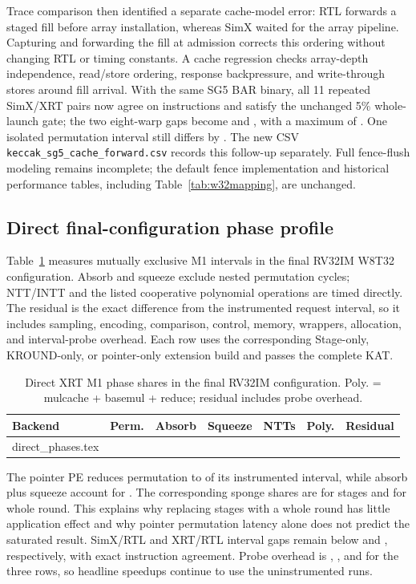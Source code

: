 \documentclass[conference,letterpaper]{IEEEtran}
\makeatletter
\newcommand{\tablerows}[1]{\@@input #1 }
\newcommand{\src}[1]{\par\smallskip{\scriptsize Source: \nolinkurl{#1}.}}
\makeatother
\begin{document}
Trace comparison then identified a separate cache-model error: RTL forwards
a staged fill before array installation, whereas SimX waited for the array
pipeline. Capturing and forwarding the fill at admission corrects this
ordering without changing RTL or timing constants. A cache regression checks
array-depth independence, read/store ordering, response backpressure, and
write-through stores around fill arrival. With the same SG5 BAR binary,
all 11 repeated SimX/XRT pairs now agree on instructions and satisfy the
unchanged 5\% whole-launch gate; the two eight-warp gaps become
\SgFiveCacheGapPacked{} and \SgFiveCacheGapSingle{}, with a maximum of
\SgFiveCacheMaxGap{}. One isolated permutation interval still differs by
\SgFiveCacheMaxSpanGap{}. The new CSV \texttt{keccak\_sg5\_cache\_forward.csv}
records this follow-up separately. Full fence-flush modeling remains
incomplete; the default fence implementation and historical performance
tables, including Table~\ref{tab:w32mapping}, are unchanged.

\subsection{Direct final-configuration phase profile}
Table~\ref{tab:directphases} measures mutually exclusive M1 intervals in the
final RV32IM W8T32 configuration. Absorb and squeeze exclude nested
permutation cycles; NTT/INTT and the listed cooperative polynomial operations
are timed directly. The residual is the exact difference from the
instrumented request interval, so it includes sampling, encoding, comparison,
control, memory, wrappers, allocation, and interval-probe overhead. Each row
uses the corresponding Stage-only, KROUND-only, or pointer-only extension
build and passes the complete KAT.

\begin{table}[t]
\caption{Direct XRT M1 phase shares in the final RV32IM configuration.
Poly. = mulcache + basemul + reduce; residual includes probe overhead.}
\label{tab:directphases}
\centering\scriptsize\setlength{\tabcolsep}{2pt}
\begin{tabular}{@{}lrrrrrr@{}}
\toprule
Backend & Perm. & Absorb & Squeeze & NTTs & Poly. & Residual \\
\midrule
\tablerows{direct_phases.tex}
\bottomrule
\end{tabular}
\src{pqc/results/mlkem_phase_profile.csv}
\end{table}

The pointer PE reduces permutation to \DirectPointerPermuteShare{} of its
instrumented interval, while absorb plus squeeze account for
\DirectPointerSpongeShare{}. The corresponding sponge shares are
\DirectStageSpongeShare{} for stages and \DirectRoundSpongeShare{} for whole
round. This explains why replacing stages with a whole round has little
application effect and why pointer permutation latency alone does not predict
the saturated result. SimX/RTL and XRT/RTL interval gaps remain below
\DirectMaxSimxRtlGap{} and \DirectMaxXrtRtlGap{}, respectively, with exact
instruction agreement. Probe overhead is \DirectStageProbeOverhead{},
\DirectRoundProbeOverhead{}, and \DirectPointerProbeOverhead{} for the three
rows, so headline speedups continue to use the uninstrumented runs.
\end{document}
